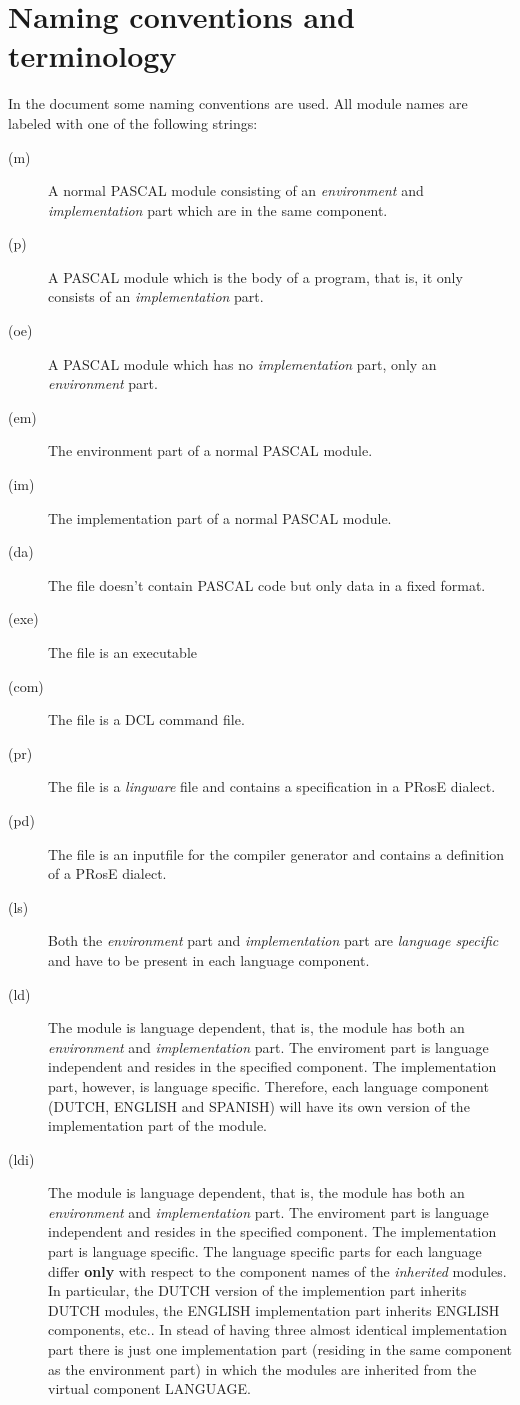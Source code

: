\section{Naming conventions and terminology}
In the document some naming conventions are used. All module names are
labeled with one of the following strings:
\begin{description}
   \item[(m) ] A normal PASCAL module consisting of an {\em environment} and
              {\em implementation}
              part which are in the same component.
   \item[(p) ] A PASCAL module which is the body of a program, that is, it
              only consists of an {\em implementation} part.
   \item[(oe) ] A PASCAL module which has no {\em implementation} part, only an
               {\em environment} part.
   \item[(em)] The environment part of a normal PASCAL module.
   \item[(im)] The implementation part of a normal PASCAL module.
   \item[(da)] The file doesn't contain PASCAL code but only data in a fixed
               format.
   \item[(exe)] The file is an executable
   \item[(com)] The file is a DCL command file.
   \item[(pr)] The file is a {\em lingware} file and contains a specification
               in a {\sf PRosE} dialect.
   \item[(pd)] The file is an inputfile for the compiler generator and
               contains a definition of a {\sf PRosE} dialect.
   \item[(ls)] Both the {\em environment} part and {\em implementation} part
               are {\em language specific} and have to be present in each
               language component.
   \item[(ld)] The module is language dependent, that is, the module has both
               an {\em environment} and {\em implementation} part. The
enviroment part is language independent and resides in the specified component.
The implementation part, however, is language specific. Therefore, each
language component (DUTCH, ENGLISH and SPANISH) will have its own version of
the implementation part of the module.
   \item[(ldi)] The module is language dependent, that is, the module has both
               an {\em environment} and {\em implementation} part. The
enviroment part is language independent and resides in the specified component.
The implementation part is language specific. The language specific parts for
each language differ {\bf only} with respect to the component names of the {\em
inherited} modules.
In particular, the DUTCH version of the implemention part inherits DUTCH
modules, the ENGLISH implementation part inherits ENGLISH components, etc..
In stead of having three almost identical implementation part there is just
one implementation part (residing in the same component as the environment part)
in which the modules are inherited from the virtual component LANGUAGE.
\end{description}

